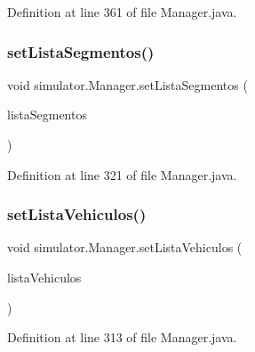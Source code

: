 Definition at line 361 of file Manager.\+java.

\mbox{\label{classsimulator_1_1_manager_af491f7a126893a6436bbd624ffc17ed9}} 
\subsubsection{\texorpdfstring{set\+Lista\+Segmentos()}{setListaSegmentos()}}
{\footnotesize\ttfamily void simulator.\+Manager.\+set\+Lista\+Segmentos (\begin{DoxyParamCaption}\item[{Array\+List$<$ \mbox{\hyperlink{classsimulator_1_1_segmento}{Segmento}} $>$}]{lista\+Segmentos }\end{DoxyParamCaption})}



Definition at line 321 of file Manager.\+java.

\mbox{\label{classsimulator_1_1_manager_a8f54c75ba31adb082ffbf25813caad71}} 
\subsubsection{\texorpdfstring{set\+Lista\+Vehiculos()}{setListaVehiculos()}}
{\footnotesize\ttfamily void simulator.\+Manager.\+set\+Lista\+Vehiculos (\begin{DoxyParamCaption}\item[{Array\+List$<$ \mbox{\hyperlink{classsimulator_1_1_vehiculo}{Vehiculo}} $>$}]{lista\+Vehiculos }\end{DoxyParamCaption})}



Definition at line 313 of file Manager.\+java.

\mbox{\label{classsimulator_1_1_manager_ab4d473d9764b3aab34e02cc10a1e9645}} 
